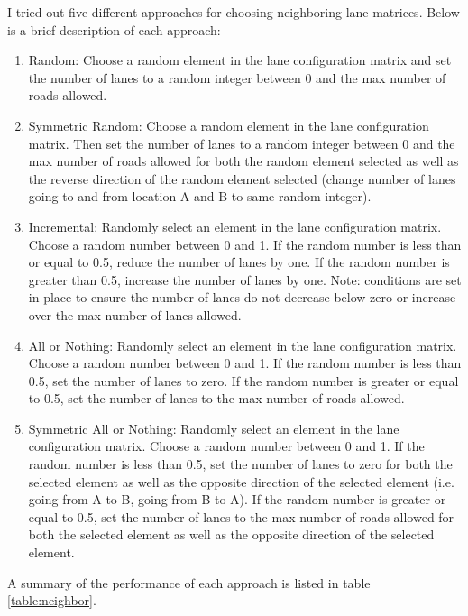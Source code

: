 \documentclass[11pt]{article}
\begin{document}
I tried out five different approaches for choosing neighboring lane matrices. Below is a brief description of each approach:
\begin{enumerate}
	\item Random: Choose a random element in the lane configuration matrix and set the number of lanes to a random integer between 0 and the max number of roads allowed.
	\item Symmetric Random: Choose a random element in the lane configuration matrix. Then set the number of lanes to a random integer between 0 and the max number of roads allowed for both the random element selected as well as the reverse direction of the random element selected (change number of lanes going to and from location A and B to same random integer).
	\item Incremental: Randomly select an element in the lane configuration matrix. Choose a random number between 0 and 1. If the random number is less than or equal to 0.5, reduce the number of lanes by one. If the random number is greater than 0.5, increase the number of lanes by one. Note: conditions are set in place to ensure the number of lanes do not decrease below zero or increase over the max number of lanes allowed.
	\item All or Nothing: Randomly select an element in the lane configuration matrix. Choose a random number between 0 and 1. If the random number is less than 0.5, set the number of lanes to zero. If the random number is greater or equal to 0.5, set the number of lanes to the max number of roads allowed.
	\item Symmetric All or Nothing: Randomly select an element in the lane configuration matrix. Choose a random number between 0 and 1. If the random number is less than 0.5, set the number of lanes to zero for both the selected element as well as the opposite direction of the selected element (i.e. going from A to B, going from B to A). If the random number is greater or equal to 0.5, set the number of lanes to the max number of roads allowed for both the selected element as well as the opposite direction of the selected element.
\end{enumerate}
A summary of the performance of each approach is listed in table \ref{table:neighbor}.
\end{document}
